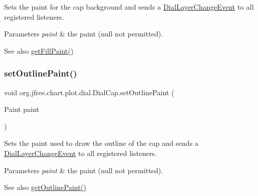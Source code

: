 Sets the paint for the cap background and sends a \mbox{\hyperlink{classorg_1_1jfree_1_1chart_1_1plot_1_1dial_1_1_dial_layer_change_event}{Dial\+Layer\+Change\+Event}} to all registered listeners.


\begin{DoxyParams}{Parameters}
{\em paint} & the paint ({\ttfamily null} not permitted).\\
\hline
\end{DoxyParams}
\begin{DoxySeeAlso}{See also}
\mbox{\hyperlink{classorg_1_1jfree_1_1chart_1_1plot_1_1dial_1_1_dial_cap_ada4f2b656e3b997bbdbdc50bc287ebc8}{get\+Fill\+Paint()}} 
\end{DoxySeeAlso}
\mbox{\label{classorg_1_1jfree_1_1chart_1_1plot_1_1dial_1_1_dial_cap_af4948903ce3b7d78acc4cc715c5f6ab9}} 
\subsubsection{\texorpdfstring{set\+Outline\+Paint()}{setOutlinePaint()}}
{\footnotesize\ttfamily void org.\+jfree.\+chart.\+plot.\+dial.\+Dial\+Cap.\+set\+Outline\+Paint (\begin{DoxyParamCaption}\item[{Paint}]{paint }\end{DoxyParamCaption})}

Sets the paint used to draw the outline of the cap and sends a \mbox{\hyperlink{classorg_1_1jfree_1_1chart_1_1plot_1_1dial_1_1_dial_layer_change_event}{Dial\+Layer\+Change\+Event}} to all registered listeners.


\begin{DoxyParams}{Parameters}
{\em paint} & the paint ({\ttfamily null} not permitted).\\
\hline
\end{DoxyParams}
\begin{DoxySeeAlso}{See also}
\mbox{\hyperlink{classorg_1_1jfree_1_1chart_1_1plot_1_1dial_1_1_dial_cap_ae42cbd4fbc603f98a00e9bcd9e90365c}{get\+Outline\+Paint()}} 
\end{DoxySeeAlso}
\mbox{\label{classorg_1_1jfree_1_1chart_1_1plot_1_1dial_1_1_dial_cap_a1e220f1d41c509b7be9708871e0d3078}} 
